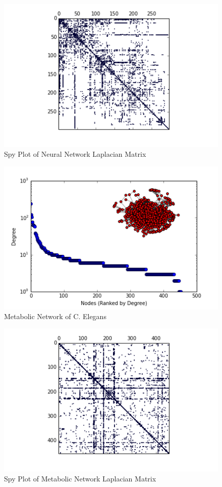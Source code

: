 \documentclass{article}
\begin{document}
\begin{figure}
\centering
\includegraphics[width = \linewidth]{neuralspy.png}
\caption{Spy Plot of Neural Network Laplacian Matrix}
\end{figure}

\begin{figure}
\centering

\includegraphics[width=\linewidth]{meta_degree_histogram.png}
\caption{Metabolic Network of C. Elegans \cite{Duch:2005}}
  
\end{figure}
\begin{figure}
\centering
\includegraphics[width = \linewidth]{metaspy.png}
\caption{Spy Plot of Metabolic Network Laplacian Matrix}
\end{figure}
\end{document}
